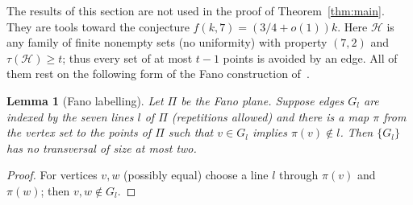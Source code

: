 \documentclass[11pt]{amsart}
\newtheorem{lemma}[theorem]{Lemma}
\theoremstyle{definition}
\theoremstyle{remark}
\newcommand{\cH}{\mathcal H}
\begin{document}
The results of this section are not used in the proof of Theorem~\ref{thm:main}. They are tools toward the conjecture $f(k,7)=(3/4+o(1))k$. Here $\cH$ is any family of finite nonempty sets (no uniformity) with property $(7,2)$ and $\tau(\cH)\ge t$; thus every set of at most $t-1$ points is avoided by an edge. All of them rest on the following form of the Fano construction of~\cite{FKW}.

\begin{lemma}[Fano labelling]\label{lem:fano}
Let $\Pi$ be the Fano plane. Suppose edges $G_l$ are indexed by the seven lines $l$ of $\Pi$ (repetitions allowed) and there is a map $\pi$ from the vertex set to the points of $\Pi$ such that $v\in G_l$ implies $\pi(v)\notin l$. Then $\{G_l\}$ has no transversal of size at most two.
\end{lemma}
\begin{proof}
For vertices $v,w$ (possibly equal) choose a line $l$ through $\pi(v)$ and $\pi(w)$; then $v,w\notin G_l$.
\end{proof}
\end{document}
